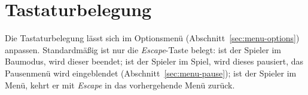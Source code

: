 \section{Tastaturbelegung}

Die Tastaturbelegung lässt sich im Optionsmenü
(Abschnitt~\ref{sec:menu-options}) anpassen. Standardmäßig ist nur die
\emph{Escape}-Taste belegt: ist der Spieler im Baumodus, wird dieser beendet;
ist der Spieler im Spiel, wird dieses pausiert, das Pausenmenü wird
eingeblendet (Abschnitt~\ref{sec:menu-pause}); ist der Spieler im Menü, kehrt
er mit \emph{Escape} in das vorhergehende Menü zurück.

